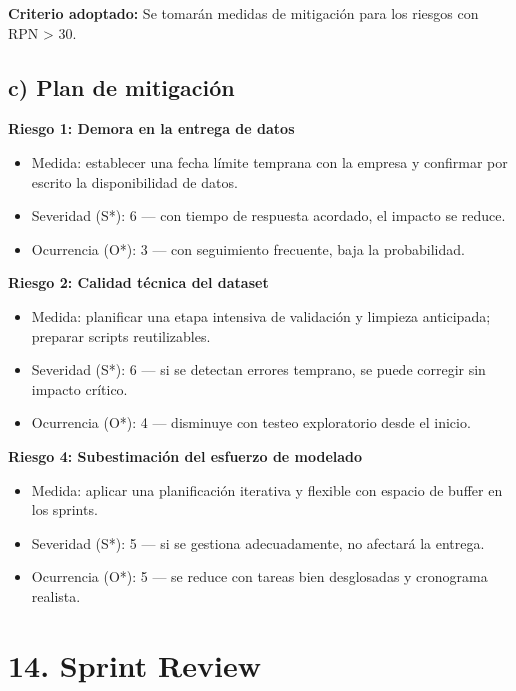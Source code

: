 \documentclass[
11pt, %
]{charter}
\begin{document}
\textbf{Criterio adoptado:}  
Se tomarán medidas de mitigación para los riesgos con RPN > 30.

\subsection*{c) Plan de mitigación}

\textbf{Riesgo 1: Demora en la entrega de datos}
\begin{itemize}
  \item Medida: establecer una fecha límite temprana con la empresa y confirmar por escrito la disponibilidad de datos.
  \item Severidad (S*): 6 — con tiempo de respuesta acordado, el impacto se reduce.
  \item Ocurrencia (O*): 3 — con seguimiento frecuente, baja la probabilidad.
\end{itemize}

\textbf{Riesgo 2: Calidad técnica del dataset}
\begin{itemize}
  \item Medida: planificar una etapa intensiva de validación y limpieza anticipada; preparar scripts reutilizables.
  \item Severidad (S*): 6 — si se detectan errores temprano, se puede corregir sin impacto crítico.
  \item Ocurrencia (O*): 4 — disminuye con testeo exploratorio desde el inicio.
\end{itemize}

\textbf{Riesgo 4: Subestimación del esfuerzo de modelado}
\begin{itemize}
  \item Medida: aplicar una planificación iterativa y flexible con espacio de buffer en los sprints.
  \item Severidad (S*): 5 — si se gestiona adecuadamente, no afectará la entrega.
  \item Ocurrencia (O*): 5 — se reduce con tareas bien desglosadas y cronograma realista.
\end{itemize}

\section{14. Sprint Review}
\label{sec:sprint_review}
\end{document}
